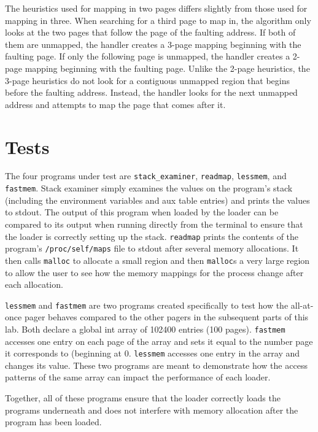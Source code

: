 \documentclass[a4paper]{article}
\begin{document}
{ The heuristics used for mapping in two pages differs slightly from those used for mapping in three. When searching for a third page to map in, the algorithm only looks at the two pages that follow the page of the faulting address. If both of them are unmapped, the handler creates a 3-page mapping beginning with the faulting page. If only the following page is unmapped, the handler creates a 2-page mapping beginning with the faulting page. Unlike the 2-page heuristics, the 3-page heuristics do not look for a contiguous unmapped region that begins before the faulting address. Instead, the handler looks for the next unmapped address and attempts to map the page that comes after it.

\section{Tests}
The four programs under test are \verb|stack_examiner|, \verb|readmap|, \verb|lessmem|, and \verb|fastmem|. Stack examiner simply examines the values on the program's stack (including the environment variables and aux table entries) and prints the values to stdout. The output of this program when loaded by the loader can be compared to its output when running directly from the terminal to ensure that the loader is correctly setting up the stack. \verb|readmap| prints the contents of the program's \verb|/proc/self/maps| file to stdout after several memory allocations. It then calls \verb|malloc| to allocate a small region and then \verb|malloc|s a very large region to allow the user to see how the memory mappings for the process change after each allocation. 

\verb|lessmem| and \verb|fastmem| are two programs created specifically to test how the all-at-once pager behaves compared to the other pagers in the subsequent parts of this lab. Both declare a global int array of 102400 entries (100 pages). \verb|fastmem| accesses one entry on each page of the array and sets it equal to the number page it corresponds to (beginning at 0.  \verb|lessmem| accesses one entry in the array and changes its value. These two programs are meant to demonstrate how the access patterns of the same array can impact the performance of each loader.

Together, all of these programs ensure that the loader correctly loads the programs underneath and does not interfere with memory allocation after the program has been loaded.



}
\end{document}
